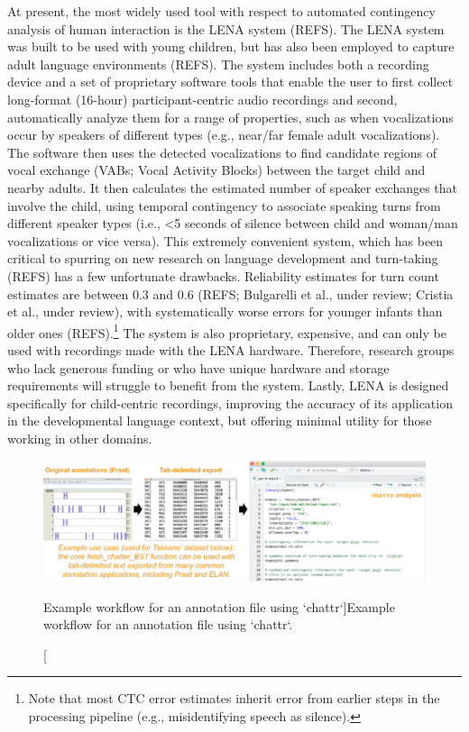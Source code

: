 \documentclass[10pt, letterpaper]{article}
\newenvironment{CodeChunk}{}{}
\begin{document}
At present, the most widely used tool with respect to automated
contingency analysis of human interaction is the LENA system (REFS). The
LENA system was built to be used with young children, but has also been
employed to capture adult language environments (REFS). The system
includes both a recording device and a set of proprietary software tools
that enable the user to first collect long-format (16-hour)
participant-centric audio recordings and second, automatically analyze
them for a range of properties, such as when vocalizations occur by
speakers of different types (e.g., near/far female adult vocalizations).
The software then uses the detected vocalizations to find candidate
regions of vocal exchange (VABs; Vocal Activity Blocks) between the
target child and nearby adults. It then calculates the estimated number
of speaker exchanges that involve the child, using temporal contingency
to associate speaking turns from different speaker types (i.e.,
\textless5 seconds of silence between child and woman/man vocalizations
or vice versa). This extremely convenient system, which has been
critical to spurring on new research on language development and
turn-taking (REFS) has a few unfortunate drawbacks. Reliability
estimates for turn count estimates are between 0.3 and 0.6 (REFS;
Bulgarelli et al., under review; Cristia et al., under review), with
systematically worse errors for younger infants than older ones
(REFS).\footnote{Note that most CTC error estimates inherit error from
  earlier steps in the processing pipeline (e.g., misidentifying speech
  as silence).} The system is also proprietary, expensive, and can only
be used with recordings made with the LENA hardware. Therefore, research
groups who lack generous funding or who have unique hardware and storage
requirements will struggle to benefit from the system. Lastly, LENA is
designed specifically for child-centric recordings, improving the
accuracy of its application in the developmental language context, but
offering minimal utility for those working in other domains.

\begin{CodeChunk}
\begin{figure}[h]

{\centering \includegraphics{figs/workflow-1} 

}

\caption[Example workflow for an annotation file using `chattr`]{Example workflow for an annotation file using `chattr`.}\label{fig:workflow}
\end{figure}
\end{CodeChunk}
\end{document}
